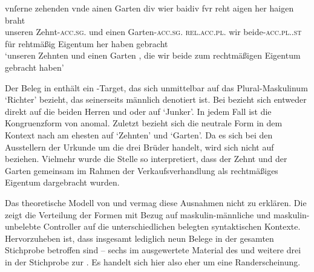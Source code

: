 \begin{exe}
\begin{xlist}
	\ex \label{ex:m+m_beidiu_5}
		\gll vnſerne zehenden \textelp{} vnde ainen Garten \textelp{} div wier
				baidiv fvr reht aigen her haigen~ braht \\
			unseren Zehnt-\textsc{acc.sg.\MascI} {} und einen
				Garten-\textsc{acc.sg.\MascI} {} \textsc{rel.acc.pl.\NeutI} wir
				beide-\textsc{acc.pl.\NeutI.st} für rehtmäßig Eigentum her
				haben gebracht \\
		\trans `unseren Zehnten \textelp{} und einen Garten \textelp{}, die wir
			beide zum rechtmäßigen Eigentum gebracht haben'
			\parencites(Nrn.~1201~AB, Kl.~Heiligkreuztal, Kr.~Biberach, 1290)[472,10--14]{cao2}

	\end{xlist}
\end{exe}

Der Beleg in  enthält ein -Target, das sich
unmittelbar auf das Plural-Maskulinum  `Richter' bezieht, das
seinerseits männlich denotiert ist. Bei  bezieht sich
 entweder direkt auf die beiden Herren
 und  oder auf
 `Junker'. In jedem Fall ist die Kongruenzform von 
anomal. Zuletzt bezieht sich die neutrale Form  in
 dem Kontext nach am ehesten auf  `Zehnten'
und  `Garten'. Da es sich bei den Ausstellern der Urkunde um die
drei Brüder 
\autocites(Nrn.~1201~AB)[472,6--7]{cao2} handelt, wird sich  nicht
auf  beziehen. Vielmehr wurde die Stelle so interpretiert, dass der
Zehnt und der Garten gemeinsam im Rahmen der Verkaufsverhandlung als
rechtmäßiges Eigentum dargebracht wurden.

Das theoretische Modell von \citet{wechsler2009} und \citet{wechslerzlatic2003}
vermag diese Ausnahmen nicht zu erklären. Die  zeigt die
Verteilung der Formen mit Bezug auf maskulin-männliche und maskulin-unbelebte
Controller auf die unterschiedlichen belegten syntaktischen Kontexte.
Hervorzuheben ist, dass insgesamt lediglich neun Belege in der gesamten
Stichprobe betroffen sind -- sechs im ausgewertete Material des \CAO{} und
weitere drei in der Stichprobe zur \KC{}. Es handelt sich hier also eher um
eine Randerscheinung.

